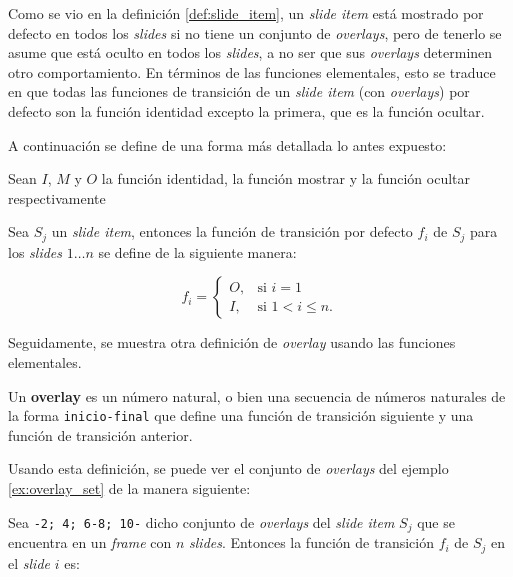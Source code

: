 		Como se vio en la definición \ref{def:slide_item}, un \textit{slide item} está mostrado por defecto en todos los \textit{slides} si no tiene un conjunto de \textit{overlays}, pero de tenerlo se asume que está oculto en todos los \textit{slides}, a no ser que sus \textit{overlays} determinen otro comportamiento. En términos de las funciones elementales, esto se traduce en que todas las funciones de transición de un \textit{slide item} (con \textit{overlays}) por defecto son la función identidad excepto la primera, que es la función ocultar. 

		A continuación se define de una forma más detallada lo antes expuesto:

 		Sean \( I \), \( M \) y \( O \) la función identidad, la función mostrar y la función ocultar respectivamente


        Sea \( S_j \) un \textit{slide item}, entonces la función de transición por defecto \( f_i \) de \( S_j \) para los \textit{slides} \( 1 \dots n \) se define de la siguiente manera:


		\begin{equation}
		\label{eq:default}
			f_i = 
			\begin{cases}
				O, & \mbox{si }i = 1 \\
				I, & \mbox{si }1 < i \leq n.
			\end{cases}
		\end{equation}

		Seguidamente, se muestra otra definición de \textit{overlay} usando las funciones elementales.

		\begin{definition}
		\label{def:new_overlay}

 			Un \textnormal{\textbf{overlay}} es un número natural, o bien una secuencia de números naturales de la forma \texttt{inicio-final} que define una función de transición siguiente y una función de transición anterior.

		\end{definition}

		Usando esta definición, se puede ver el conjunto de \textit{overlays} del ejemplo \ref{ex:overlay_set} de la manera siguiente:


		Sea \texttt{-2; 4; 6-8; 10-} dicho conjunto de \textit{overlays} del \textit{slide item} \( S_j \) que se encuentra en un \textit{frame} con \( n \) \textit{slides}. Entonces la función de transición \( f_i \) de \( S_j \) en el \textit{slide} \( i \) es:

